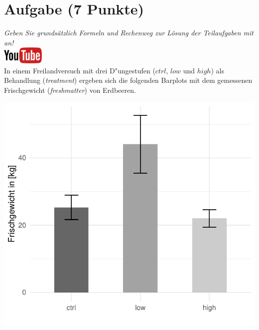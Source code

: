 \documentclass[a4paper, 9pt]{scrartcl}\usepackage[]{graphicx}\usepackage[]{xcolor}
\makeatletter
\def\maxwidth{ %
  \ifdim\Gin@nat@width>\linewidth
    \linewidth
  \else
    \Gin@nat@width
  \fi
}
\makeatother
\begin{document}
 
\clearpage

\section{Aufgabe \hfill (7 Punkte)}

\textit{Geben Sie grunds{\"a}tzlich Formeln und Rechenweg zur L{\"o}sung der
  Teilaufgaben mit an!} \\[1Ex]

\hfill\href{https://youtu.be/t0WYa_LVc5o}{\includegraphics[width = 2cm]{img/youtube}}\\[1Ex]



In einem Freilandversuch mit drei D{"u}ngestufen ($ctrl$, $low$ und $high$) als Behandlung
(\textit{treatment}) ergeben sich die folgenden Barplots mit dem
gemessenen Frischgewicht (\textit{freshmatter}) von Erdbeeren.




{\centering \includegraphics[width=\maxwidth]{img/barplot-02-1} 

}
\end{document}
